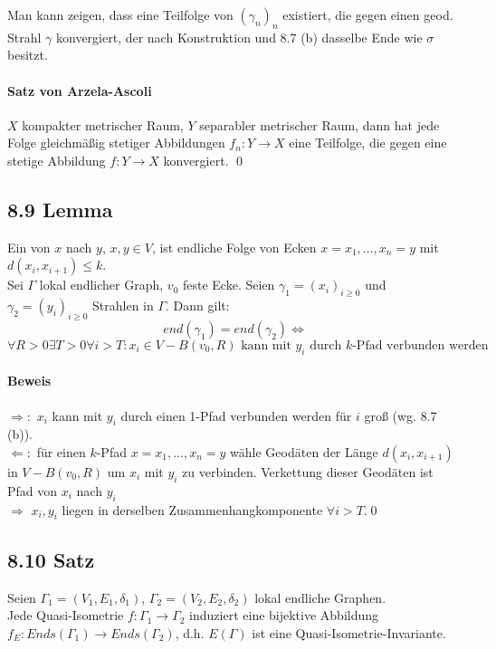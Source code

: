 \documentclass{article}
\begin{document}
Man kann zeigen, dass eine Teilfolge von $(\gamma_n)_n$ existiert, die gegen einen geod. Strahl $\gamma$ konvergiert, der nach Konstruktion und 8.7 (b) dasselbe Ende wie $\sigma$ besitzt.

\paragraph{Satz von Arzela-Ascoli}
$X$ kompakter metrischer Raum, $Y$ separabler metrischer Raum, dann hat jede Folge gleichmäßig stetiger Abbildungen $f_n : Y \rightarrow X$ eine Teilfolge, die gegen eine stetige Abbildung $f : Y \rightarrow X$ konvergiert.
\qed

\subsection{8.9 Lemma}
Ein  von $x$ nach $y$, $x,y \in V$, ist endliche Folge von Ecken $x = x_1,\ldots, x_n = y$ mit $d(x_i, x_{i+1}) \leq k$.\\
Sei $\Gamma$ lokal endlicher Graph, $v_0$ feste Ecke. Seien $\gamma_1 = (x_i)_{i \geq 0}$ und $\gamma_2 = (y_i)_{i \geq 0}$ Strahlen in $\Gamma$. Dann gilt:
\[end(\gamma_1) = end(\gamma_2) \Longleftrightarrow\]
\[\forall R > 0 \exists T > 0\forall i > T: x_i \in V- B(v_0, R) \text{ kann mit } y_i \text{ durch }k\text{-Pfad verbunden werden} \]

\paragraph{Beweis}
$\Longrightarrow: $ $x_i$ kann mit $y_i$ durch einen 1-Pfad verbunden werden für $i$ groß (wg. 8.7 (b)).\\
$\Longleftarrow: $ für einen $k$-Pfad $x = x_1, \ldots, x_n = y$ wähle Geodäten der Länge $d(x_i,x_{i+1})$ in $V- B(v_0,R)$ um $x_i$ mit $y_i$ zu verbinden. Verkettung dieser Geodäten ist Pfad von $x_i$ nach $y_i$\\
$\Longrightarrow$ $x_i, y_i$ liegen in derselben Zusammenhangkomponente $\forall i > T$.\qed


\subsection{8.10 Satz}
Seien $\Gamma_1 = (V_1, E_1, \delta_1)$, $\Gamma_2 = (V_2, E_2, \delta_2)$ lokal endliche Graphen.\\
Jede Quasi-Isometrie $f:\Gamma_1 \rightarrow \Gamma_2$ induziert eine bijektive Abbildung $f_E : Ends(\Gamma_1) \rightarrow Ends(\Gamma_2)$, d.h. $E(\Gamma)$ ist eine Quasi-Isometrie-Invariante.
\end{document}
